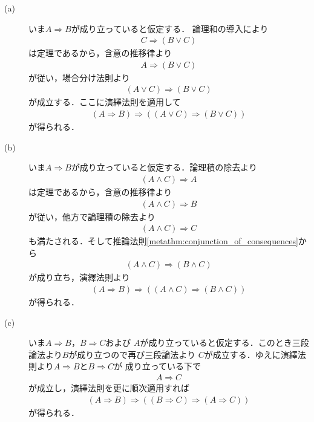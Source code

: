 	\begin{prf}\mbox{}
		\begin{description}
			\item[(a)]
				いま$A \Longrightarrow B$が成り立っていると仮定する．
				論理和の導入により
				\begin{align}
					C \Longrightarrow (B \vee C)
				\end{align}
				は定理であるから，含意の推移律より
				\begin{align}
					A \Longrightarrow (B \vee C)
				\end{align}
				が従い，場合分け法則より
				\begin{align}
					(A \vee C) \Longrightarrow (B \vee C)
				\end{align}
				が成立する．ここに演繹法則を適用して
				\begin{align}
					(A \Longrightarrow B) \Longrightarrow 
					( (A \vee C) \Longrightarrow (B \vee C) )
				\end{align}
				が得られる．
				
			\item[(b)]
				いま$A \Longrightarrow B$が成り立っていると仮定する．論理積の除去より
				\begin{align}
					(A \wedge C) \Longrightarrow A
				\end{align}
				は定理であるから，含意の推移律より
				\begin{align}
					(A \wedge C) \Longrightarrow B
				\end{align}
				が従い，他方で論理積の除去より
				\begin{align}
					(A \wedge C) \Longrightarrow C
				\end{align}
				も満たされる．そして推論法則\ref{metathm:conjunction_of_consequences}から
				\begin{align}
					(A \wedge C) \Longrightarrow (B \wedge C)
				\end{align}
				が成り立ち，演繹法則より
				\begin{align}
					(A \Longrightarrow B) \Longrightarrow ((A \wedge C) \Longrightarrow (B \wedge C))
				\end{align}
				が得られる．
				
			\item[(c)]
				いま$A \Longrightarrow B$，$B \Longrightarrow C$および
				$A$が成り立っていると仮定する．このとき三段論法より$B$が成り立つので再び三段論法より
				$C$が成立する．ゆえに演繹法則より$A \Longrightarrow B$と$B \Longrightarrow C$が
				成り立っている下で
				\begin{align}
					A \Longrightarrow C
				\end{align}
				が成立し，演繹法則を更に順次適用すれば
				\begin{align}
					(A \Longrightarrow B) \Longrightarrow ( (B \Longrightarrow C) \Longrightarrow (A \Longrightarrow C) )
				\end{align}
				が得られる．
				

\end{description}
\end{prf}
